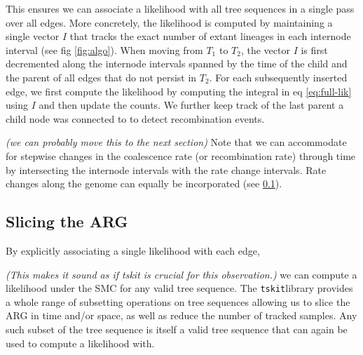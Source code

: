 \documentclass{article}
\newcommand{\argweaver}[0]{\texttt{ARGweaver}}
\newcommand{\tskit}[0]{\texttt{tskit}}
\newcommand{\comment}[1]{{\it \color{orange} (#1)}}
\begin{document}
This ensures we can associate a likelihood
with all tree sequences in a single pass over all edges.
More concretely, the likelihood is computed by maintaining a single vector $I$ that tracks
the exact number of extant lineages in each internode interval (see fig \ref{fig:algo}).
When moving from $T_1$ to $T_2$, the vector $I$ is first decremented along the internode intervals
spanned by the time of the child and the parent of all edges that do not persist in $T_2$.
For each subsequently inserted edge, we first compute the likelihood by computing the integral
in eq \ref{eq:full-lik} using $I$ and then update the counts. We further keep track of
the last parent a child node was connected to to detect recombination events.


\comment{we can probably move this to the next section}
Note that we can accommodate for stepwise changes in the coalescence rate (or recombination rate)
through time by intersecting the internode intervals with the rate change intervals.
Rate changes along the genome can equally be incorporated (see \ref{sec:slicing}).



\subsection{Slicing the ARG} \label{sec:slicing}

By explicitly associating a single likelihood with each edge, 

\comment{This makes it sound as if tskit is crucial for this observation.}
we can compute a likelihood
under the SMC for any valid tree sequence. The \tskit library provides a whole range
of subsetting operations on tree sequences allowing us to slice the ARG in time and/or space,
as well as reduce the number of tracked samples.
Any such subset of the tree sequence is itself a valid tree sequence
that can again be used to compute a likelihood with.
\end{document}
